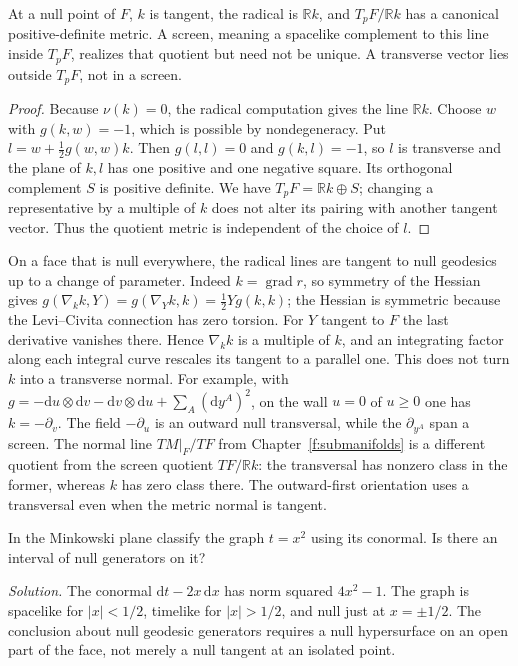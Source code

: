 \begin{proposition}\label{f:null-screen}
At a null point of $F$, $k$ is tangent, the radical is $\mathbb R k$, and $T_pF/\mathbb R k$ has a canonical positive-definite metric. A screen, meaning a spacelike complement to this line inside $T_pF$, realizes that quotient but need not be unique. A transverse vector lies outside $T_pF$, not in a screen.
\end{proposition}
\begin{proof}
Because $\nu(k)=0$, the radical computation gives the line $\mathbb R k$. Choose $w$ with $g(k,w)=-1$, which is possible by nondegeneracy. Put $l=w+\tfrac12 g(w,w)k$. Then $g(l,l)=0$ and $g(k,l)=-1$, so $l$ is transverse and the plane of $k,l$ has one positive and one negative square. Its orthogonal complement $S$ is positive definite. We have $T_pF=\mathbb R k\oplus S$; changing a representative by a multiple of $k$ does not alter its pairing with another tangent vector. Thus the quotient metric is independent of the choice of $l$.
\end{proof}

On a face that is null everywhere, the radical lines are tangent to null geodesics up to a change of parameter. Indeed $k=\operatorname{grad}r$, so symmetry of the Hessian gives $g(\nabla_k k,Y)=g(\nabla_Y k,k)=\tfrac12 Yg(k,k)$; the Hessian is symmetric because the Levi--Civita connection has zero torsion. For $Y$ tangent to $F$ the last derivative vanishes there. Hence $\nabla_k k$ is a multiple of $k$, and an integrating factor along each integral curve rescales its tangent to a parallel one. This does not turn $k$ into a transverse normal. For example, with $g=-\mathrm du\otimes\mathrm dv-\mathrm dv\otimes\mathrm du+\sum_A(\mathrm dy^A)^2$, on the wall $u=0$ of $u\geq0$ one has $k=-\partial_v$. The field $-\partial_u$ is an outward null transversal, while the $\partial_{y^A}$ span a screen. The normal line $TM|_F/TF$ from Chapter~\ref{f:submanifolds} is a different quotient from the screen quotient $TF/\mathbb R k$: the transversal has nonzero class in the former, whereas $k$ has zero class there. The outward-first orientation uses a transversal even when the metric normal is tangent.

\begin{exercise}
In the Minkowski plane classify the graph $t=x^2$ using its conormal. Is there an interval of null generators on it?

\emph{Solution.} The conormal $\mathrm dt-2x\,\mathrm dx$ has norm squared $4x^2-1$. The graph is spacelike for $|x|<1/2$, timelike for $|x|>1/2$, and null just at $x=\pm1/2$. The conclusion about null geodesic generators requires a null hypersurface on an open part of the face, not merely a null tangent at an isolated point.
\end{exercise}

